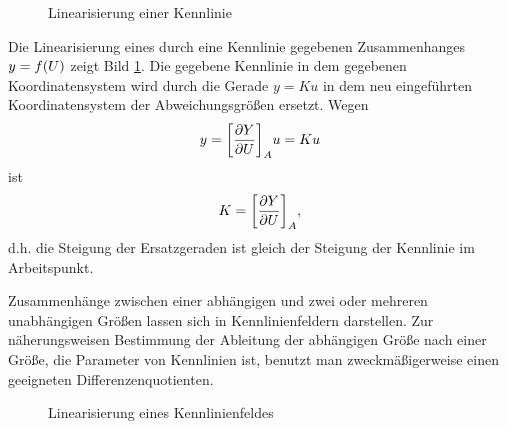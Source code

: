 \begin{figure}[h]
    \centering
    \caption{Linearisierung einer Kennlinie}
    \label{fig:2-3}
\end{figure}

Die Linearisierung eines durch eine Kennlinie gegebenen Zusammenhanges \(y = f\parentheses*{U}\) zeigt Bild \ref{fig:2-3}.
Die gegebene Kennlinie in dem gegebenen Koordinatensystem wird durch die Gerade \(y = Ku\) in dem neu eingeführten Koordinatensystem der Abweichungsgrößen ersetzt.
Wegen
\begin{equation}
    y = \brackets*{\frac{\partial Y}{\partial U}}_A u = Ku
\end{equation}
ist
\begin{equation}
    K = \brackets*{\frac{\partial Y}{\partial U}}_A,
\end{equation}
d.h. die Steigung der Ersatzgeraden ist gleich der Steigung der Kennlinie im Arbeitspunkt.

Zusammenhänge zwischen einer abhängigen und zwei oder mehreren unabhängigen Größen lassen sich in Kennlinienfeldern darstellen.
Zur näherungsweisen Bestimmung der Ableitung der abhängigen Größe nach einer Größe, die Parameter von Kennlinien ist, benutzt man zweckmäßigerweise einen geeigneten Differenzenquotienten.

\begin{figure}[h]
    \centering
    \caption{Linearisierung eines Kennlinienfeldes}
    \label{fig:2-4}
\end{figure}

